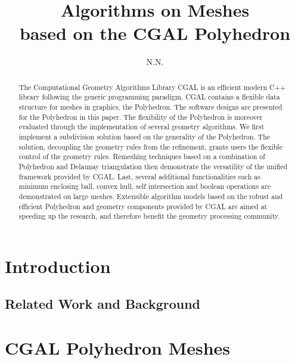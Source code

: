 \documentclass{egpubl}
\title{Algorithms on Meshes \\ 
       based on the CGAL Polyhedron}
\author[N.N.]{N.N.}
\begin{document}
\maketitle

\begin{abstract}


The Computational Geometry Algorithms Library CGAL is an efficient
modern C++ library following the generic programming paradigm. CGAL
contains a flexible data structure for meshes in graphics, the
Polyhedron. The software designs are presented for the Polyhedron in
this paper. The flexibility of the Polyhedron is moreover evaluated
through the implementation of several geometry algorithms.  We first
implement a subdivision solution based on the generality of the
Polyhedron. The solution, decoupling the geometry rules from the
refinement, grants users the flexible control of the geometry rules.
Remeshing techniques based on a combination of Polyhedron and Delaunay
triangulation then demonstrate the versatility of the unified
framework provided by CGAL.  Last, several additional functionalities
such as minimum enclosing ball, convex hull, self intersection and
boolean operations are demonstrated on large meshes.  Extensible
algorithm models based on the robust and efficient Polyhedron and
geometry components provided by CGAL are aimed at speeding up the
research, and therefore benefit the geometry processing community.

\begin{classification} %
\end{classification}

\end{abstract}


\section{Introduction}


\subsection{Related Work and Background}
 

\section{CGAL Polyhedron Meshes}
 
\end{document}
